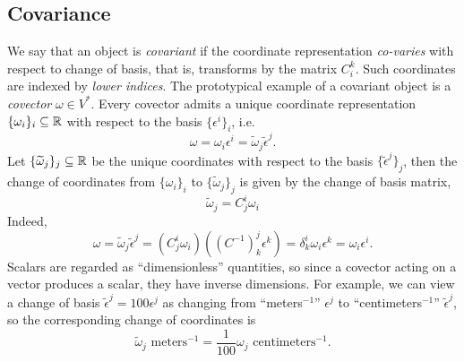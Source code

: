 \subsection{Covariance}

We say that an object is \emph{covariant} if the coordinate representation \textit{co-varies} with respect to change of basis, that is, transforms by the matrix $C^k_i$.  Such coordinates are indexed by \textit{lower indices}. The prototypical example of a covariant object is a \emph{covector} $\omega \in V^*$. Every covector admits a unique coordinate representation $\{\omega_i \}_i \subseteq \mathbb R$ with respect to the basis $\{\epsilon^i\}_i$, i.e.
	\[ \omega = \omega_i \epsilon^i = \widetilde \omega_j \widetilde \epsilon^j. \]
Let $\{\widetilde \omega_j \}_j \subseteq \mathbb R$ be the unique coordinates with respect to the basis $\{\widetilde \epsilon^j\}_j$, then the change of coordinates from $\{\omega_i\}_i$ to $\{\widetilde \omega_j\}_j$ is given by the change of basis matrix,
	\[ \widetilde \omega_j = C^i_j \omega_i \]
Indeed, 
	\[ \omega = \widetilde \omega_j \widetilde \epsilon^j = \left( C^i_j \omega_i \right) \left( (C^{-1})_k^j \epsilon^k \right) =  \delta^i_k \omega_i \epsilon^k = \omega_i \epsilon^i. \]
Scalars are regarded as ``dimensionless'' quantities, so since a covector acting on a vector produces a scalar, they have inverse dimensions. For example, we can view a change of basis $\widetilde \epsilon^j = 100 \epsilon^j$ as changing from  ``meters$^{-1}$'' $\epsilon^j$ to ``centimeters$^{-1}$'' $\widetilde \epsilon^j$, so the corresponding change of coordinates is 
	\[ \widetilde \omega_j \text{ meters$^{-1}$} = \frac{1}{100} \omega_j  \text{ centimeters$^{-1}$}. \]

